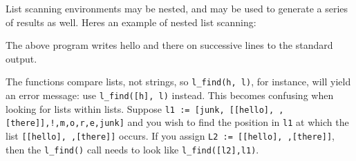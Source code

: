 List scanning environments may be nested, and may be used to generate a
series of results as well. Here{\textquotesingle}s an example of nested
list scanning:


The above program writes {\textquotedbl}hello{\textquotedbl} and
{\textquotedbl}there{\textquotedbl} on successive lines to the standard
output.

The functions compare lists, not strings, so
\texttt{l\_find({\textquotedbl}h{\textquotedbl}, l)}, for instance,
will yield an error message: use
\texttt{l\_find([{\textquotedbl}h{\textquotedbl}], l)} instead. This
becomes confusing when looking for lists within lists. Suppose
\texttt{l1 := [{\textquotedbl}junk{\textquotedbl},
[[{\textquotedbl}hello{\textquotedbl}],{\textquotedbl}
{\textquotedbl},[{\textquotedbl}there{\textquotedbl}]],{\textquotedbl}!{\textquotedbl},{\textquotedbl}m{\textquotedbl},{\textquotedbl}o{\textquotedbl},{\textquotedbl}r{\textquotedbl},{\textquotedbl}e{\textquotedbl},{\textquotedbl}junk{\textquotedbl}]}
and you wish to find the position in \texttt{l1} at which the list
\texttt{[[{\textquotedbl}hello{\textquotedbl}],{\textquotedbl}
{\textquotedbl},[{\textquotedbl}there{\textquotedbl}]]} occurs. If you
assign \texttt{L2 :=
[[{\textquotedbl}hello{\textquotedbl}],{\textquotedbl}
{\textquotedbl},[{\textquotedbl}there{\textquotedbl}]]}, then the
\texttt{l\_find()} call needs to look like \texttt{l\_find([l2],l1)}.

